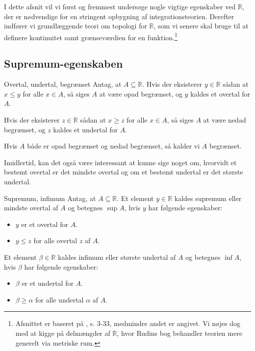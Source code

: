 I dette afsnit vil vi først og fremmest undersøge nogle vigtige egenskaber ved $\mathbb{R}$, der er nødvendige for en stringent opbygning af integrationsteorien.
Derefter indfører vi grundlæggende teori om topologi for $\mathbb{R}$, som vi senere skal bruge til at definere kontinuitet samt grænseværdien for en funktion.\footnote{Afsnittet er baseret på \cite{Rudin1976}, s. 3-33, medmindre andet er angivet. Vi nøjes dog med at kigge på delmængder af $\mathbb{R}$, hvor Rudins bog behandler teorien mere generelt via metriske rum.}

\subsection{Supremum-egenskaben}%
  \label{sub:Supremum-egenskaben}

\begin{definition}[label=def:overtal]{Overtal, undertal, begrænset}{}
  Antag, at $A \subseteq \mathbb{R}$. 
  Hvis der eksisterer $y \in \mathbb{R}$ sådan at $x \leq y$ for alle $x \in A$, så siges $A$ at være opad begrænset, og $y$ kaldes et overtal for $A$. 

  Hvis der eksisterer $z \in \mathbb{R}$ sådan at $x \geq z$ for alle $x \in A$, så siges $A$ at være nedad begrænset, og $z$ kaldes et undertal for $A$. 

  Hvis $A$ både er opad begrænset og nedad begrænset, så kalder vi $A$ begrænset. 
\end{definition}

Imidlertid, kan det også være interessant at kunne sige noget om, hvorvidt et bestemt overtal er det mindste overtal og om et bestemt undertal er det største undertal.

\begin{definition}[label=def:sup]{Supremum, infimum}{}
  Antag, at $A \subseteq \mathbb{R}$. Et element $y \in \mathbb{R}$ kaldes supremum eller mindste overtal af $A$ og betegnes $\sup A$, hvis $y$ har følgende egenskaber:
  \begin{itemize}
    \item $y$ er et overtal for $A$.
    \item $y \leq z$ for alle overtal $z$ af $A$. 
  \end{itemize}
  Et element $\beta \in \mathbb{R}$ kaldes infimum eller største undertal af $A$ og betegnes $\inf A$, hvis $\beta$ har følgende egenskaber:
  \begin{itemize}
    \item $\beta$ er et undertal for $A$.
    \item $\beta \geq \alpha$ for alle undertal $\alpha$ af $A$. 
  \end{itemize}
\end{definition}


